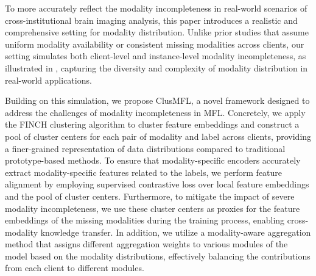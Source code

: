 
To more accurately reflect the modality incompleteness in real-world scenarios of cross-institutional brain imaging analysis, this paper introduces a realistic and comprehensive setting for modality distribution. Unlike prior studies that assume uniform modality availability or consistent missing modalities across clients, our setting simulates both client-level and instance-level modality incompleteness, as illustrated in , capturing the diversity and complexity of modality distribution in real-world applications.

Building on this simulation, we propose ClusMFL, a novel framework designed to address the challenges of modality incompleteness in MFL. Concretely, we apply the FINCH clustering algorithm \cite{FINCH} to cluster feature embeddings and construct a pool of cluster centers for each pair of modality and label across clients, providing a finer-grained representation of data distributions compared to traditional prototype-based methods. To ensure that modality-specific encoders accurately extract modality-specific features related to the labels, we perform feature alignment by employing supervised contrastive loss \cite{supervised_contrastive_loss} over local feature embeddings and the pool of cluster centers. Furthermore, to mitigate the impact of severe modality incompleteness, we use these cluster centers as proxies for the feature embeddings of the missing modalities during the training process, enabling cross-modality knowledge transfer. In addition, we utilize a modality-aware aggregation method that assigns different aggregation weights to various modules of the model based on the modality distributions, effectively balancing the contributions from each client to different modules.

